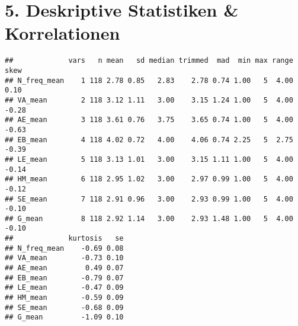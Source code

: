 \documentclass[
]{article}
\newenvironment{Shaded}{\begin{snugshade}}{\end{snugshade}}
\newcommand{\CommentTok}[1]{\textcolor[rgb]{0.56,0.35,0.01}{\textit{#1}}}
\newcommand{\FunctionTok}[1]{\textcolor[rgb]{0.13,0.29,0.53}{\textbf{#1}}}
\newcommand{\NormalTok}[1]{#1}
\newcommand{\OtherTok}[1]{\textcolor[rgb]{0.56,0.35,0.01}{#1}}
\newcommand{\SpecialCharTok}[1]{\textcolor[rgb]{0.81,0.36,0.00}{\textbf{#1}}}
\newcommand{\StringTok}[1]{\textcolor[rgb]{0.31,0.60,0.02}{#1}}
\begin{document}
\section{5. Deskriptive Statistiken \&
Korrelationen}\label{deskriptive-statistiken-korrelationen}

\begin{Shaded}
\end{Shaded}

\begin{verbatim}
##             vars   n mean   sd median trimmed  mad  min max range  skew
## N_freq_mean    1 118 2.78 0.85   2.83    2.78 0.74 1.00   5  4.00  0.10
## VA_mean        2 118 3.12 1.11   3.00    3.15 1.24 1.00   5  4.00 -0.28
## AE_mean        3 118 3.61 0.76   3.75    3.65 0.74 1.00   5  4.00 -0.63
## EB_mean        4 118 4.02 0.72   4.00    4.06 0.74 2.25   5  2.75 -0.39
## LE_mean        5 118 3.13 1.01   3.00    3.15 1.11 1.00   5  4.00 -0.14
## HM_mean        6 118 2.95 1.02   3.00    2.97 0.99 1.00   5  4.00 -0.12
## SE_mean        7 118 2.91 0.96   3.00    2.93 0.99 1.00   5  4.00 -0.10
## G_mean         8 118 2.92 1.14   3.00    2.93 1.48 1.00   5  4.00 -0.10
##             kurtosis   se
## N_freq_mean    -0.69 0.08
## VA_mean        -0.73 0.10
## AE_mean         0.49 0.07
## EB_mean        -0.79 0.07
## LE_mean        -0.47 0.09
## HM_mean        -0.59 0.09
## SE_mean        -0.68 0.09
## G_mean         -1.09 0.10
\end{verbatim}
\end{document}
